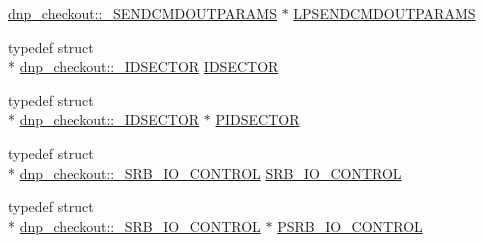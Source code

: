 \begin{DoxyCompactItemize}
\hyperlink{structdnp__checkout_1_1___s_e_n_d_c_m_d_o_u_t_p_a_r_a_m_s}{dnp\-\_\-checkout\-::\-\_\-\-S\-E\-N\-D\-C\-M\-D\-O\-U\-T\-P\-A\-R\-A\-M\-S} $\ast$ \hyperlink{namespacednp__checkout_a1599a2a7c423c931ae18286e45a03cdb}{L\-P\-S\-E\-N\-D\-C\-M\-D\-O\-U\-T\-P\-A\-R\-A\-M\-S}
\item 
typedef struct \\*
\hyperlink{structdnp__checkout_1_1___i_d_s_e_c_t_o_r}{dnp\-\_\-checkout\-::\-\_\-\-I\-D\-S\-E\-C\-T\-O\-R} \hyperlink{namespacednp__checkout_a778f09eed45cfcd63f3039c57a7112f4}{I\-D\-S\-E\-C\-T\-O\-R}
\item 
typedef struct \\*
\hyperlink{structdnp__checkout_1_1___i_d_s_e_c_t_o_r}{dnp\-\_\-checkout\-::\-\_\-\-I\-D\-S\-E\-C\-T\-O\-R} $\ast$ \hyperlink{namespacednp__checkout_a6285f85f01ec201545b921c24a977b6e}{P\-I\-D\-S\-E\-C\-T\-O\-R}
\item 
typedef struct \\*
\hyperlink{structdnp__checkout_1_1___s_r_b___i_o___c_o_n_t_r_o_l}{dnp\-\_\-checkout\-::\-\_\-\-S\-R\-B\-\_\-\-I\-O\-\_\-\-C\-O\-N\-T\-R\-O\-L} \hyperlink{namespacednp__checkout_a74494cad5b370a2f9a0d169e95a6f00d}{S\-R\-B\-\_\-\-I\-O\-\_\-\-C\-O\-N\-T\-R\-O\-L}
\item 
typedef struct \\*
\hyperlink{structdnp__checkout_1_1___s_r_b___i_o___c_o_n_t_r_o_l}{dnp\-\_\-checkout\-::\-\_\-\-S\-R\-B\-\_\-\-I\-O\-\_\-\-C\-O\-N\-T\-R\-O\-L} $\ast$ \hyperlink{namespacednp__checkout_a7ad15bc16156c925f8f86efd5740cefe}{P\-S\-R\-B\-\_\-\-I\-O\-\_\-\-C\-O\-N\-T\-R\-O\-L}
\end{DoxyCompactItemize}
